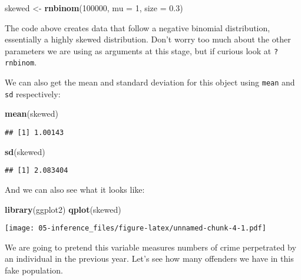 \documentclass[
]{book}
\newenvironment{Shaded}{\begin{snugshade}}{\end{snugshade}}
\newcommand{\AttributeTok}[1]{\textcolor[rgb]{0.13,0.29,0.53}{#1}}
\newcommand{\DecValTok}[1]{\textcolor[rgb]{0.00,0.00,0.81}{#1}}
\newcommand{\FloatTok}[1]{\textcolor[rgb]{0.00,0.00,0.81}{#1}}
\newcommand{\FunctionTok}[1]{\textcolor[rgb]{0.13,0.29,0.53}{\textbf{#1}}}
\newcommand{\NormalTok}[1]{#1}
\newcommand{\OtherTok}[1]{\textcolor[rgb]{0.56,0.35,0.01}{#1}}
\begin{document}
\begin{Shaded}
\begin{Highlighting}[]
\NormalTok{skewed }\OtherTok{\textless{}{-}} \FunctionTok{rnbinom}\NormalTok{(}\DecValTok{100000}\NormalTok{, }\AttributeTok{mu =} \DecValTok{1}\NormalTok{, }\AttributeTok{size =} \FloatTok{0.3}\NormalTok{) }
\end{Highlighting}
\end{Shaded}

The code above creates data that follow a negative binomial distribution, essentially a highly skewed distribution. Don't worry too much about the other parameters we are using as arguments at this stage, but if curious look at \texttt{?rnbinom}.

We can also get the mean and standard deviation for this object using \texttt{mean} and \texttt{sd} respectively:

\begin{Shaded}
\begin{Highlighting}[]
\FunctionTok{mean}\NormalTok{(skewed)}
\end{Highlighting}
\end{Shaded}

\begin{verbatim}
## [1] 1.00143
\end{verbatim}

\begin{Shaded}
\begin{Highlighting}[]
\FunctionTok{sd}\NormalTok{(skewed)}
\end{Highlighting}
\end{Shaded}

\begin{verbatim}
## [1] 2.083404
\end{verbatim}

And we can also see what it looks like:

\begin{Shaded}
\begin{Highlighting}[]
\FunctionTok{library}\NormalTok{(ggplot2)}
\FunctionTok{qplot}\NormalTok{(skewed)}
\end{Highlighting}
\end{Shaded}

\texttt{[image: 05-inference\_files/figure-latex/unnamed-chunk-4-1.pdf]}

We are going to pretend this variable measures numbers of crime perpetrated by an individual in the previous year. Let's see how many offenders we have in this fake population.
\end{document}
